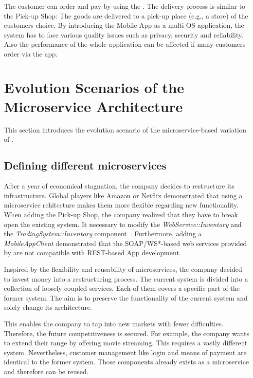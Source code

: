 The customer can order and pay by using the . 
The delivery process is similar to the Pick-up Shop: The goods are delivered to a pick-up place (e.g., a store) of the customers choice.
By introducing the Mobile App as a multi OS application, the \CoCoME system has to face various quality issues such as privacy, security and reliability. 
Also the performance of the whole application can be affected if many customers order via the app.





\section{Evolution Scenarios of the Microservice Architecture}
This section introduces the evolution scenario of the microservice-based variation of \CoCoME.
\subsection{Defining different microservices}
After a year of economical stagnation, the \CoCoME company decides to restructure its infrastructure. 
Global players like Amazon or Netflix demonstrated that using a microservice rchitecture makes them more flexible regarding new functionality. 
When adding the Pick-up Shop, the \CoCoME company realized that they have to break open the existing system. 
It  necessary to modify the \textit{WebService::Inventory} and the \textit{TradingSystem::Inventory} component~\cite{HeinrichRostamiReussner2016_1000052688}. 
Furthermore, adding a \textit{MobileAppClient} demonstrated that the SOAP/WS*-based web services provided by \CoCoME are not compatible with REST-based App development.

Inspired by the flexibility and reusability of microservices, the \CoCoME company decided to invest money into a restructuring process. 
The current system is divided into a collection of loosely coupled services. Each of them covers a specific part of the former \CoCoME system. 
The aim is to preserve the functionality of the current system and solely change its architecture.

This enables the company to tap into new markets with fewer difficulties. 
Therefore, the future competitiveness is secured. 
For example, the \CoCoME company wants to extend their  range by offering movie streaming.%
This requires a vastly different system. 
Nevertheless, customer management like login and means of payment are identical to the former \CoCoME system. 
Those components already exists as a microservice and therefore can be reused. 








	
	
